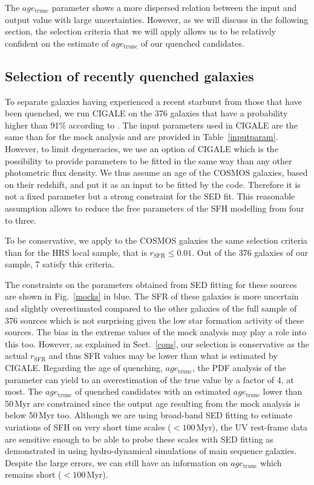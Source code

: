 \documentclass[traditabstract]{aa} %
\begin{document}
The $age_{\mathrm{trunc}}$ parameter shows a more dispersed relation between the input and output value with large uncertainties.
However, as we will discuss in the following section, the selection criteria that we will apply allows us to be relatively confident on the estimate of $age_{\mathrm{trunc}}$ of our quenched candidates. 

\subsection{Selection of recently quenched galaxies}
To separate galaxies having experienced a recent starburst from those that have been quenched, we run CIGALE on the 376 galaxies that have a probability higher than 91$\%$ according to \cite{Aufort20}.
The input parameters used in CIGALE are the same than for the mock analysis and are provided in Table~\ref{inputparam}.
However, to limit degeneracies, we use an option of CIGALE which is the possibility to provide parameters to be fitted in the same way than any other photometric flux density.
We thus assume an age of the COSMOS galaxies, based on their redshift, and put it as an input to be fitted by the code.
Therefore it is not a fixed parameter but a strong constraint for the SED fit.
This reasonable assumption allows to reduce the free parameters of the SFH modelling from four to three.

To be conservative, we apply to the COSMOS galaxies the same selection criteria than for the HRS local sample, that is $r_{\mathrm{SFR}}\leq0.01$.
Out of the 376 galaxies of our sample, 7 satisfy this criteria.

The constraints on the parameters obtained from SED fitting for these sources are shown in Fig.~\ref{mocks} in blue.
The SFR of these galaxies is more uncertain and slightly overestimated compared to the other galaxies of the full sample of 376 sources which is not surprising given the low star formation activity of these sources.
The bias in the extreme values of the mock analysis may play a role into this too.
However, as explained in Sect.~\ref{cons}, our selection is conservative as the actual $r_{\mathrm{SFR}}$ and thus SFR values may be lower than what is estimated by CIGALE.
Regarding the age of quenching, $age_{\mathrm{trunc}}$, the PDF analysis of the parameter can yield to an overestimation of the true value by a factor of 4, at most.
The $age_{\mathrm{trunc}}$ of quenched candidates with an estimated $age_{\mathrm{trunc}}$ lower than 50\,Myr are constrained since the output age resulting from the mock analysis is below 50\,Myr too.
Although we are using broad-band SED fitting to estimate variations of SFH on very short time scales ($<100$\,Myr), the UV rest-frame data are sensitive enough to be able to probe these scales with SED fitting as demonstrated in \cite{Boquien14} using hydro-dynamical simulations of main sequence galaxies.
Despite the large errors, we can still have an information on $age_{\mathrm{trunc}}$ which remains short ($<100$\,Myr). 
\end{document}
